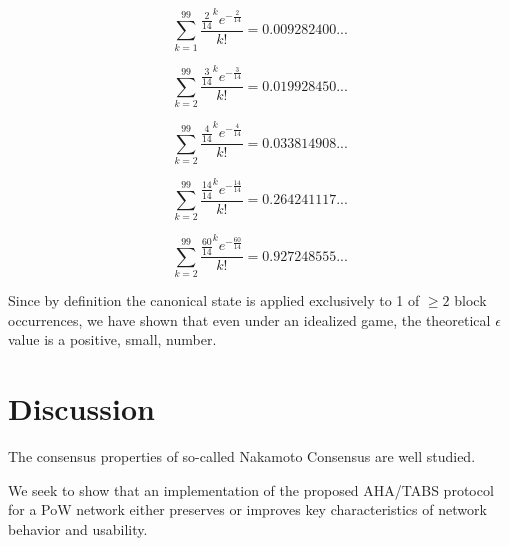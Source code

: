 \documentclass[11pt]{article}
\theoremstyle{plain}
\begin{document}
{{\begin{equation}
    \sum_{k=1}^{99}\frac{\frac{2}{14}^{k}e^{-\frac{2}{14}}}{k!} = 0.009282400...
\end{equation}

\begin{equation}
    \sum_{k=2}^{99}\frac{\frac{3}{14}^{k}e^{-\frac{3}{14}}}{k!} = 0.019928450...
\end{equation}

\begin{equation}
    \sum_{k=2}^{99}\frac{\frac{4}{14}^{k}e^{-\frac{4}{14}}}{k!} = 0.033814908...
\end{equation}

\begin{equation}
    \sum_{k=2}^{99}\frac{\frac{14}{14}^{k}e^{-\frac{14}{14}}}{k!} = 0.264241117...
\end{equation}

\begin{equation}
    \sum_{k=2}^{99}\frac{\frac{60}{14}^{k}e^{-\frac{60}{14}}}{k!} = 0.927248555...
\end{equation}


Since by definition the canonical state is applied exclusively to 1 of
$\geq 2$ block occurrences, we have shown that even under an idealized game,
the theoretical $\epsilon$ value is a positive, small, number.
} %


\section{\normalsize{Discussion}}

The consensus properties of so-called Nakamoto Consensus are well studied.

We seek to show that an implementation of the proposed AHA/TABS protocol for a PoW network
either preserves or improves key characteristics of network behavior and usability.

}
\end{document}

